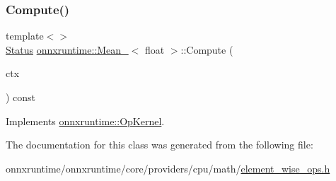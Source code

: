 \subsubsection{\texorpdfstring{Compute()}{Compute()}\hspace{0.1cm}{\footnotesize\ttfamily [2/2]}}
{\footnotesize\ttfamily template$<$$>$ \\
\mbox{\hyperlink{classonnxruntime_1_1common_1_1Status}{Status}} \mbox{\hyperlink{classonnxruntime_1_1Mean__6}{onnxruntime\+::\+Mean\+\_}}$<$ float $>$\+::Compute (\begin{DoxyParamCaption}\item[{\mbox{\hyperlink{classonnxruntime_1_1OpKernelContext}{Op\+Kernel\+Context}} $\ast$}]{ctx }\end{DoxyParamCaption}) const\hspace{0.3cm}{\ttfamily [virtual]}}



Implements \mbox{\hyperlink{classonnxruntime_1_1OpKernel_a9eca8656a78b1b3ab9d3351a12798650}{onnxruntime\+::\+Op\+Kernel}}.



The documentation for this class was generated from the following file\+:\begin{DoxyCompactItemize}
\item 
onnxruntime/onnxruntime/core/providers/cpu/math/\mbox{\hyperlink{element__wise__ops_8h}{element\+\_\+wise\+\_\+ops.\+h}}\end{DoxyCompactItemize}
